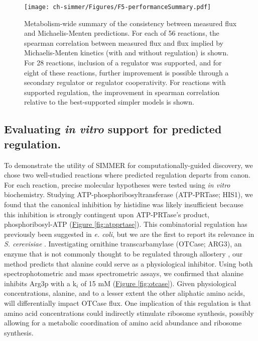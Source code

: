 \begin{figure}[h!]
\texttt{[image: ch-simmer/Figures/F5-performanceSummary.pdf]}
\caption[Metabolism-wide summary of the consistency between measured flux and Michaelis-Menten predictions]{Metabolism-wide summary of the consistency between measured flux and Michaelis-Menten predictions. For each of 56 reactions, the spearman correlation between measured flux and flux implied by Michaelis-Menten kinetics (with and without regulation) is shown.  For 28 reactions, inclusion of a regulator was supported, and for eight of these reactions, further improvement is possible through a secondary regulator or regulator cooperativity.  For reactions with supported regulation, the improvement in spearman correlation relative to the best-supported simpler models is shown.}
\label{fig:allosteryFit}
\end{figure}

\subsection{Evaluating \textit{in vitro} support for predicted regulation.}

To demonstrate the utility of SIMMER for computationally-guided discovery, we chose two well-studied reactions where predicted regulation departs from canon. For each reaction, precise molecular hypotheses were tested using \textit{in vitro} biochemistry.  Studying ATP-phosphoribosyltransferase (ATP-PRTase; HIS1), we found that the canonical inhibition by histidine was likely insufficient because this inhibition is strongly contingent upon ATP-PRTase's product, phosphoribosyl-ATP (\hyperref[fig:atpprtase]{Figure \ref{fig:atpprtase}}). This combinatorial regulation has previously been suggested in \textit{e. coli}, but we are the first to report its relevance in \textit{S. cerevisiae} \cite{DallLarsen:1976wm}.  Investigating ornithine transcarbamylase (OTCase; ARG3), an enzyme that is not commonly thought to be regulated through allostery \cite{Jones:1982dn}, our method predicts that alanine could serve as a physiological inhibitor.  Using both spectrophotometric and mass spectrometric assays, we confirmed that alanine inhibits Arg3p with a k$_{i}$ of 15 mM (\hyperref[fig:otcase]{Figure \ref{fig:otcase}}).  Given physiological concentrations, alanine, and to a lesser extent the other aliphatic amino acids, will differentially impact OTCase flux.  One implication of this regulation is that amino acid concentrations could indirectly stimulate ribosome synthesis, possibly allowing for a metabolic coordination of amino acid abundance and ribosome synthesis.


